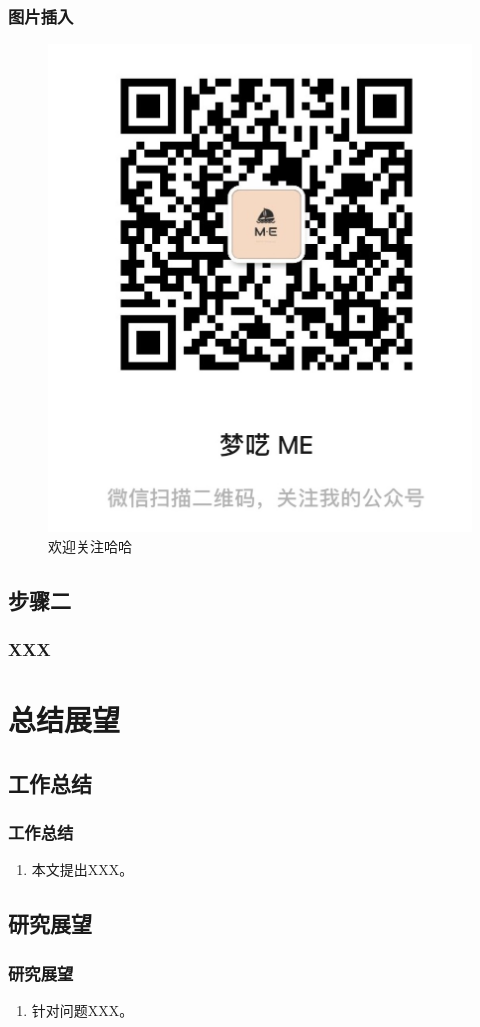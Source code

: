 \documentclass[AutoFakeBold,AutoFakeSlant]{beamer}
\begin{document}
\begin{frame}
  \frametitle{图片插入}
 
 \begin{figure}[H]
 	\centering
 	\includegraphics[width=0.5\linewidth]{figures/gzh}
 	\caption{欢迎关注哈哈}
 	\label{fig:gzh}
 \end{figure}
 
\end{frame}

\subsection{步骤二}

\begin{frame}
  \frametitle{XXX}

\end{frame}

\section{总结展望}

\subsection{工作总结}
\begin{frame}
  \frametitle{工作总结}

  \begin{enumerate}
    \item 本文提出XXX。
  \end{enumerate}
\end{frame}

\subsection{研究展望}
\begin{frame}
  \frametitle{研究展望}

  \begin{enumerate}
    \item 针对问题XXX。
  \end{enumerate}
\end{frame}
\end{document}
